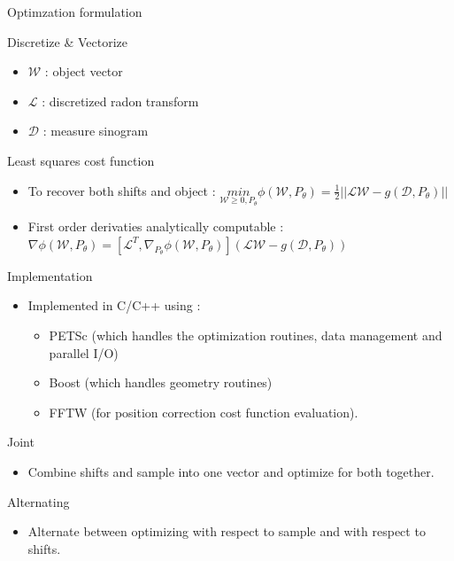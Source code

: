 \documentclass{beamer}
\begin{document}
\begin{frame}{Optimzation formulation}
	\begin{block}{Discretize \& Vectorize}
		\begin{itemize}
			\item $\mathcal{W}$ : object vector
			\item $\mathcal{L}$ : discretized radon transform
			\item $\mathcal{D}$ : measure sinogram
		\end{itemize}
	\end{block}
	\begin{exampleblock}{Least squares cost function}
		\begin{itemize}
			\item To recover both shifts and object : 
			$\underset{\mathcal{W} \geq 0, P_{\theta}}{\textit{min}}  \phi(\mathcal{W},P_{\theta}) = \frac{1}{2}||\mathcal{L}\mathcal{W} - g(\mathcal{D},P_{\theta})||$
			\item First order derivaties analytically computable :
			$ \nabla \phi(\mathcal{W},P_{\theta}) = [\mathcal{L}^{T},
			\nabla_{P_{\theta}} \phi(\mathcal{W},P_{\theta})] (\mathcal{L}\mathcal{W} - g(\mathcal{D},P_{\theta}))$
		\end{itemize}
	\end{exampleblock}
\end{frame}

\begin{frame}{Implementation}
	\begin{block}{}
		\begin{itemize}
			\item Implemented in C/C++ using :
			\begin{itemize}
				\item PETSc (which handles the optimization routines, data management and parallel I/O)
				\item Boost (which handles geometry routines) 
				\item FFTW (for position correction cost function evaluation).
			\end{itemize}
			
		\end{itemize}
	\end{block}
	\begin{block}{Joint}
		\begin{itemize}
			\item Combine shifts and sample into one vector and optimize for both together.
		\end{itemize}
	\end{block}
	\begin{exampleblock}{Alternating}
		\begin{itemize}
			\item Alternate between optimizing with respect to sample and with respect to shifts.
		\end{itemize}
	\end{exampleblock}
\end{frame}
\end{document}
